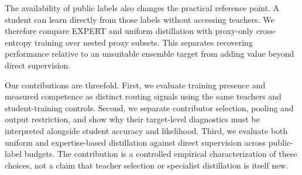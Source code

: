 The availability of public labels also changes the practical reference point. A student can learn directly from those labels without accessing teachers. We therefore compare EXPERT and uniform distillation with proxy-only cross-entropy training over nested proxy subsets. This separates recovering performance relative to an unsuitable ensemble target from adding value beyond direct supervision.

Our contributions are threefold. First, we evaluate training presence and measured competence as distinct routing signals using the same teachers and student-training controls. Second, we separate contributor selection, pooling and output restriction, and show why their target-level diagnostics must be interpreted alongside student accuracy and likelihood. Third, we evaluate both uniform and expertise-based distillation against direct supervision across public-label budgets. The contribution is a controlled empirical characterization of these choices, not a claim that teacher selection or specialist distillation is itself new.

